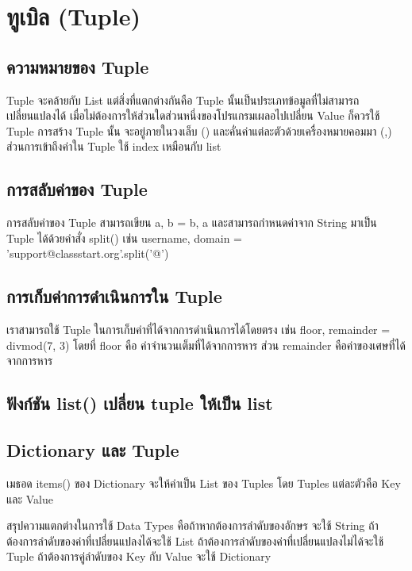 \chapter{ทูเบิล (Tuple)}
\section{ความหมายของ Tuple}

Tuple จะคล้ายกับ List แต่สิ่งที่แตกต่างกันคือ Tuple นั้นเป็นประเภทข้อมูลที่ไม่สามารถเปลี่ยนแปลงได้ เมื่อไม่ต้องการให้ส่วนใดส่วนหนึ่งของโปรแกรมเผลอไปเปลี่ยน Value ก็ควรใช้ Tuple การสร้าง Tuple นั้น จะอยู่ภายในวงเล็บ () และคั่นค่าแต่ละตัวด้วยเครื่องหมายคอมมา (,) ส่วนการเข้าถึงค่าใน Tuple ใช้ index เหมือนกับ list

\section{การสลับค่าของ Tuple}

การสลับค่าของ Tuple สามารถเขียน a, b = b, a และสามารถกำหนดค่าจาก String มาเป็น Tuple ได้ด้วยคำสั่ง split() เช่น username, domain = 'support@classstart.org'.split('@')

\section{การเก็บค่าการดำเนินการใน Tuple}

เราสามารถใช้ Tuple ในการเก็บค่าที่ได้จากการดำเนินการได้โดยตรง เช่น  floor, remainder = divmod(7, 3) โดยที่ floor คือ ค่าจำนวนเต็มที่ได้จากการหาร ส่วน remainder คือค่าของเศษที่ได้จากการหาร

\section{ฟังก์ชัน list() เปลี่ยน tuple ให้เป็น list}
\section{Dictionary และ Tuple}

เมธอด items() ของ Dictionary จะให้ค่าเป็น List  ของ Tuples โดย Tuples แต่ละตัวคือ Key และ Value 

สรุปความแตกต่างในการใช้ Data Types คือถ้าหากต้องการลำดับของอักษร จะใช้ String ถ้าต้องการลำดับของค่าที่เปลี่ยนแปลงได้จะใช้ List ถ้าต้องการลำดับของค่าที่เปลี่ยนแปลงไม่ได้จะใช้ Tuple ถ้าต้องการคู่ลำดับของ Key กับ Value จะใช้ Dictionary

